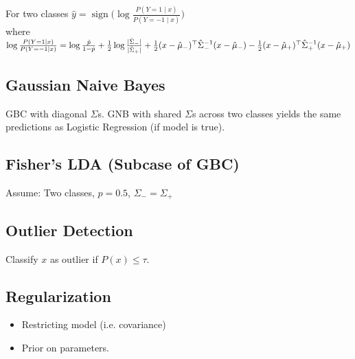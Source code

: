 For two classes $\hat{y} = \operatorname{sign}\Big(\log\frac{P(Y=1\mid x)}{P(Y=-1\mid x)}\Big) $ 
\\ where  
$    \log\frac{P(Y=1\mid x)}{P(Y=-1\mid x)} = \log \frac{\hat{p}}{1-\hat{p}} + \frac{1}{2}\log \frac{|\hat{\Sigma}_-|}{|\hat{\Sigma}_+|}\\
    + \frac{1}{2}(x - \hat{\mu}_-)^\top \hat{\Sigma}_-^{-1} (x - \hat{\mu}_-) - \frac{1}{2}(x - \hat{\mu}_+)^\top \hat{\Sigma}_+^{-1} (x - \hat{\mu}_+)$

\subsection*{Gaussian Naive Bayes}
GBC with diagonal $\Sigma$s. GNB with shared $\Sigma$s across
two classes yields the same predictions as Logistic Regression
(if model is true).

\subsection*{Fisher's LDA (Subcase of GBC)}
Assume: Two classes, $p = 0.5$, ${\Sigma}_- = {\Sigma}_+ $

\subsection*{Outlier Detection}
Classify $x$ as outlier if $P(x) \leq \tau$.

\subsection*{Regularization}
\begin{itemize}[noitemsep,leftmargin=6mm,topsep=0pt,parsep=0pt,partopsep=0pt]
    \item Restricting model (i.e. covariance)
    \item Prior on parameters.\\
\end{itemize}
